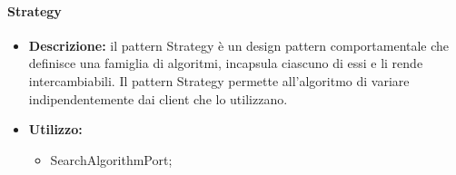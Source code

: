 \paragraph{Strategy}
\begin{itemize}
    \item{\textbf{Descrizione:}} il pattern Strategy è un design pattern comportamentale che definisce una famiglia di algoritmi, incapsula ciascuno di essi e li rende intercambiabili. Il pattern Strategy permette all'algoritmo di variare indipendentemente dai client che lo utilizzano.
    \item{\textbf{Utilizzo:}}
    \begin{itemize}
        \item SearchAlgorithmPort;
    \end{itemize}
\end{itemize}